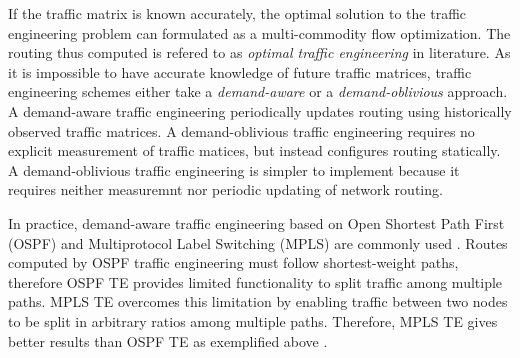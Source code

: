 If the traffic matrix is known accurately, the optimal solution to the traffic engineering problem can formulated as a multi-commodity flow optimization. The routing thus computed is refered to as \emph{optimal traffic engineering} in literature. As it is impossible to have accurate knowledge of future traffic matrices, traffic engineering schemes either take a \emph{demand-aware} or a \emph{demand-oblivious} approach. A demand-aware  traffic engineering  periodically updates routing using historically observed traffic matrices. A demand-oblivious  traffic engineering  requires no explicit measurement of traffic matices, but instead configures routing statically. A demand-oblivious  traffic engineering  is simpler to implement because it requires neither measuremnt nor periodic updating of network routing. 


In practice, demand-aware traffic engineering based on Open Shortest Path First (OSPF) and Multiprotocol Label Switching (MPLS) are commonly used  \cite{COPE,MultiTM,fortz2000internet,MPLS2}. Routes computed by OSPF traffic engineering must follow shortest-weight paths, therefore OSPF TE provides limited functionality to split traffic among multiple paths. MPLS TE overcomes this limitation by enabling traffic between two nodes to be split  in arbitrary ratios among multiple paths. Therefore, MPLS TE gives better results than OSPF TE as exemplified above \cite{COPE,MultiTM}.



